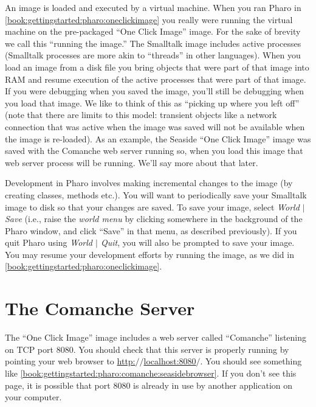 \documentclass[a4paper,10pt,twoside]{book}
\begin{document}
An image is loaded and executed by a virtual machine. When you ran Pharo in \autoref{book:gettingstarted:pharo:oneclickimage} you really were running the virtual machine on the pre-packaged ``One Click Image'' image. For the sake of brevity we call this ``running the image.'' The Smalltalk image includes active processes (Smalltalk processes are more akin to ``threads'' in other languages). When you load an image from a disk file you bring objects that were part of that image into RAM and resume execution of the active processes that were part of that image. If you were debugging when you saved the image, you'll still be debugging when you load that image. We like to think of this as ``picking up where you left off'' (note that there are limits to this model: transient objects like a network connection that was active when the image was saved will not be available when the image is re-loaded). As an example, the Seaside ``One Click Image'' image was saved with the Comanche web server running so, when you load this image that web server process will be running. We'll say more about that later.

Development in Pharo involves making incremental changes to the image (by creating classes, methods etc.). You will want to periodically save your Smalltalk image to disk so that your changes are saved. To save your image, select \textit{World $|$ Save} (i.e., raise the \textit{world menu} by clicking somewhere in the background of the Pharo window, and click ``Save'' in that menu, as described previously). If you quit Pharo using \textit{World $|$ Quit}, you will also be prompted to save your image. You may resume your development efforts by running the image, as we did in \autoref{book:gettingstarted:pharo:oneclickimage}.

\section{The Comanche Server}
\label{book:gettingstarted:pharo:comanche}

The ``One Click Image'' image includes a web server called ``Comanche'' listening on TCP port 8080. You should check that this server is properly running by pointing your web browser to \href{http://localhost:8080/}{http:$/$$/$localhost:8080$/$}. You should see something like \autoref{book:gettingstarted:pharo:comanche:seasidebrowser}. If you don't see this page, it is possible that port 8080 is already in use by another application on your computer.
\end{document}

